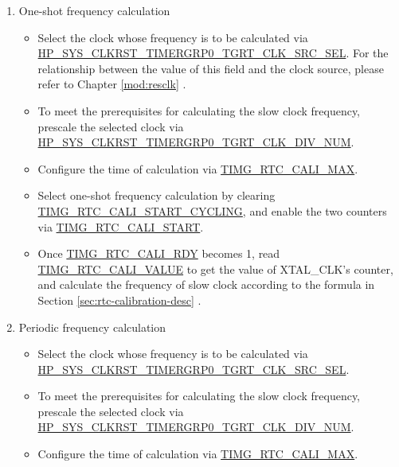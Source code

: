 \documentclass[main\_\_EN.tex]{subfiles}
\begin{document}
\begin{enumerate}
    \item One-shot frequency calculation
    \begin{itemize}
        \item Select the clock whose frequency is to be calculated via \hyperref[fielddesc:HPSYSCLKRSTTIMERGRP0TGRTCLKSRCSEL]{HP\_SYS\_CLKRST\_TIMERGRP0\_TGRT\_CLK\_SRC\_SEL}. For the relationship between the value of this field and the clock source, please refer to Chapter \ref{mod:resclk} \textit{}.

        \item To meet the prerequisites for calculating the slow clock frequency, prescale the selected clock via \hyperref[fielddesc:HPSYSCLKRSTTIMERGRP0TGRTCLKDIVNUM]{HP\_SYS\_CLKRST\_TIMERGRP0\_TGRT\_CLK\_DIV\_NUM}.

        \item Configure the time of calculation via \hyperref[fielddesc:TIMGRTCCALIMAX]{TIMG\_RTC\_CALI\_MAX}.

        \item Select one-shot frequency calculation by clearing \hyperref[fielddesc:TIMGRTCCALISTARTCYCLING]{TIMG\_RTC\_CALI\_START\_CYCLING}, and enable the two counters via \hyperref[fielddesc:TIMGRTCCALISTART]{TIMG\_RTC\_CALI\_START}.

        \item Once \hyperref[fielddesc:TIMGRTCCALIRDY]{TIMG\_RTC\_CALI\_RDY} becomes 1, read \hyperref[fielddesc:TIMGRTCCALIVALUE]{TIMG\_RTC\_CALI\_VALUE} to get the value of XTAL\_CLK's counter, and calculate the frequency of slow clock according to the formula in Section \ref{sec:rtc-calibration-desc} \textit{}.
    \end{itemize}
    \item Periodic frequency calculation
    \begin{itemize}
        \item Select the clock whose frequency is to be calculated via \hyperref[fielddesc:HPSYSCLKRSTTIMERGRP0TGRTCLKSRCSEL]{HP\_SYS\_CLKRST\_TIMERGRP0\_TGRT\_CLK\_SRC\_SEL}.

        \item To meet the prerequisites for calculating the slow clock frequency, prescale the selected clock via \hyperref[fielddesc:HPSYSCLKRSTTIMERGRP0TGRTCLKDIVNUM]{HP\_SYS\_CLKRST\_TIMERGRP0\_TGRT\_CLK\_DIV\_NUM}.

        \item Configure the time of calculation via \hyperref[fielddesc:TIMGRTCCALIMAX]{TIMG\_RTC\_CALI\_MAX}.


\end{itemize}
\end{enumerate}
\end{document}
